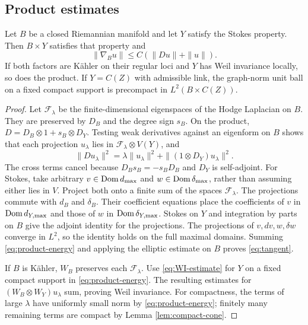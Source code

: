 \subsection{Product estimates}
\begin{lemma}\label{thm:product}
Let $B$ be a closed Riemannian manifold and let $Y$ satisfy the
Stokes property. Then $B\times Y$ satisfies that property and
\begin{equation}\label{eq:tangent}
 \|\nabla_Bu\|\le C(\|Du\|+\|u\|).
\end{equation}
If both factors are K\"ahler on their regular loci and $Y$ has
Weil invariance locally, so does the product. If $Y=C(Z)$ with
admissible link, the graph-norm unit ball on a fixed compact
support is precompact in $L^2(B\times C(Z))$.
\end{lemma}
\begin{proof}
Let $\mathcal F_\lambda$ be the finite-dimensional eigenspaces of
the Hodge Laplacian on $B$. They are preserved by $D_B$ and the
degree sign $s_B$. On the product,
$D=D_B\otimes1+s_B\otimes D_Y$. Testing weak derivatives against
an eigenform on $B$ shows that each projection $u_\lambda$ lies
in $\mathcal F_\lambda\otimes V(Y)$, and
\begin{equation}\label{eq:product-energy}
 \|Du_\lambda\|^2=\lambda\|u_\lambda\|^2
       +\|(1\otimes D_Y)u_\lambda\|^2.
\end{equation}
The cross terms cancel because $D_Bs_B=-s_BD_B$ and $D_Y$ is
self-adjoint. For Stokes, take arbitrary $v\in\operatorname{Dom} d_{\max}$
and $w\in\operatorname{Dom}\delta_{\max}$, rather than assuming either lies
in $V$. Project both onto a finite sum of the spaces
$\mathcal F_\lambda$. The projections commute with $d_B$
and $\delta_B$. Their coefficient equations place the
coefficients of $v$ in $\operatorname{Dom} d_{Y,\max}$ and those of $w$
in $\operatorname{Dom}\delta_{Y,\max}$. Stokes on $Y$ and integration by
parts on $B$ give the adjoint identity for the projections.
The projections of $v,dv,w,\delta w$ converge in $L^2$,
so the identity holds on the full maximal domains.
Summing \eqref{eq:product-energy} and applying the elliptic
estimate on $B$ proves \eqref{eq:tangent}.

If $B$ is K\"ahler, $W_B$ preserves each $\mathcal F_\lambda$.
Use \eqref{eq:WI-estimate} for $Y$ on a fixed compact support in
\eqref{eq:product-energy}. The resulting estimates for
$(W_B\otimes W_Y)u_\lambda$ sum, proving Weil invariance.
For compactness, the terms of large $\lambda$ have uniformly
small norm by \eqref{eq:product-energy}; finitely many remaining
terms are compact by Lemma \ref{lem:compact-cone}.
\end{proof}


